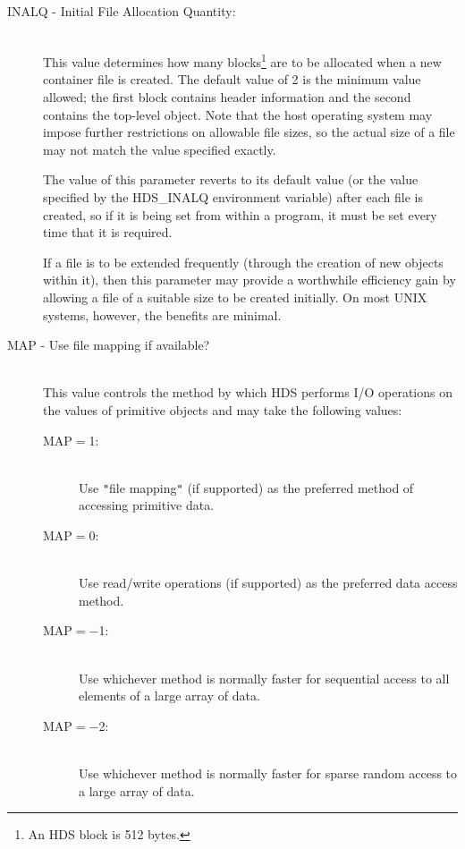 \documentclass[11pt]{article}
\newcommand{\xlabel}[1]{}
\newcommand{\qt}[1]{``#1''}
\renewcommand{\qt}[1]{{\tt{"}}#1{\tt{"}}}
\begin{document}
\begin{description}

\item [\xlabel{HDS_INALQ_tuning_parameter}INALQ - Initial File Allocation Quantity:]\mbox{}\\
This value determines how many blocks\footnote{An HDS block is 512
bytes.} are to be allocated when a new container file is created. The
default value of 2 is the minimum value allowed; the first block
contains header information and the second contains the top-level
object. Note that the host operating system may impose further
restrictions on allowable file sizes, so the actual size of a file may
not match the value specified exactly.

The value of this parameter reverts to its default value (or the value
specified by the HDS\_INALQ environment variable) after each file is
created, so if it is being set from within a program, it must be set
every time that it is required.

If a file is to be extended frequently (through the creation of new
objects within it), then this parameter may provide a worthwhile
efficiency gain by allowing a file of a suitable size to be created
initially. On most UNIX systems, however, the benefits are minimal.

\item [\xlabel{HDS_MAP_tuning_parameter}MAP - Use file mapping if available?]\mbox{}\\
This value controls the method by which HDS performs I/O operations on
the values of primitive objects and may take the following values:

\begin{description}

\item[MAP$=$1:]\mbox{}\\
Use \qt{file mapping} (if supported) as the preferred method of
accessing primitive data.

\item[MAP$=$0:]\mbox{}\\
Use read/write operations (if supported) as the preferred data access
method.

\item[MAP$=-$1:]\mbox{}\\
Use whichever method is normally faster for sequential access to all
elements of a large array of data.

\item[MAP$=-$2:]\mbox{}\\
Use whichever method is normally faster for sparse random access to a
large array of data.


\end{description}
\end{description}
\end{document}
